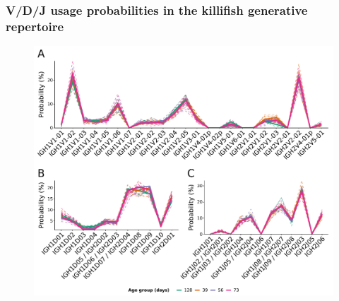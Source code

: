 \documentclass[presentation]{beamer}
\newlength{\slideheight}
\begin{document}
\begin{frame}
\frametitle{V/D/J usage probabilities in the killifish generative repertoire}
\begin{figure}
\includegraphics[height=0.95\slideheight]{figs/pdf/extra/ageing-igor-segments}
\end{figure}
\end{frame}
\end{document}
